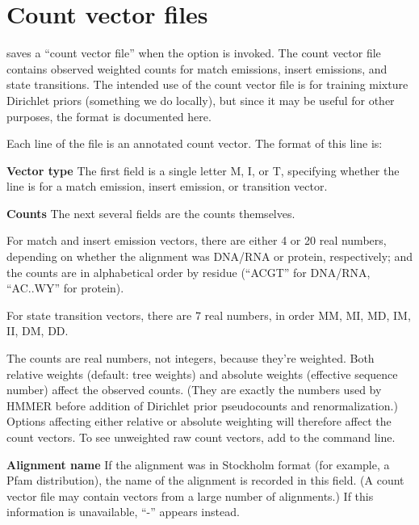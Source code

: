 \section{Count vector files}

 saves a ``count vector file'' when the 
option is invoked. The count vector file contains observed weighted
counts for match emissions, insert emissions, and state transitions.
The intended use of the count vector file is for training mixture
Dirichlet priors (something we do locally), but since it may be useful
for other purposes, the format is documented here.

Each line of the file is an annotated count vector. The format of this
line is:

\begin{wideitem}
\item[\textbf{Vector type}] The first field is a single letter M,
I, or T, specifying whether the line is for a match emission, insert
emission, or transition vector.

\item[\textbf{Counts}] The next several fields are the counts
themselves. 

For match and insert emission vectors, there are either 4 or 20 real
numbers, depending on whether the alignment was DNA/RNA or protein,
respectively; and the counts are in alphabetical order by residue
(``ACGT'' for DNA/RNA, ``AC..WY'' for protein).

For state transition vectors, there are 7 real numbers, in order MM,
MI, MD, IM, II, DM, DD.

The counts are real numbers, not integers, because they're
weighted. Both relative weights (default: tree weights) and absolute
weights (effective sequence number) affect the observed counts. (They
are exactly the numbers used by HMMER before addition of Dirichlet
prior pseudocounts and renormalization.) Options affecting either
relative or absolute weighting will therefore affect the count
vectors. To see unweighted raw count vectors, add  to the  command line.

\item[\textbf{Alignment name}] If the alignment was in Stockholm
format (for example, a Pfam distribution), the name of the alignment
is recorded in this field. (A count vector file may contain vectors
from a large number of alignments.) If this information is
unavailable, ``-'' appears instead.


\end{wideitem}
